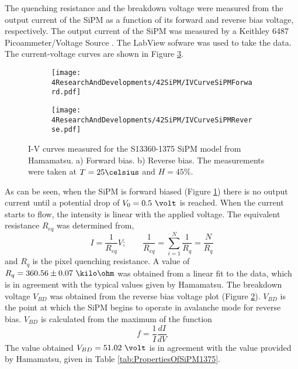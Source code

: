The quenching resistance and the breakdown voltage were measured from the output current of the SiPM as a function of its forward and reverse bias voltage, respectively. The output current of the SiPM was measured by a Keithley 6487 Picoammeter/Voltage Source \cite{DataSheetKeithley6487}. The LabView sofware was used to take the data. The current-voltage curves are shown in Figure \ref{fig:IVcurveSiPM}.
\begin{figure}
\centering
    \begin{subfigure}[b]{0.9\textwidth}
    \centering
    \texttt{[image: 4ResearchAndDevelopments/42SiPM/IVCurveSiPMForward.pdf]}  
    \caption{\label{subfig:IVcurveForward}}
    \end{subfigure}
    \hfill
    \begin{subfigure}[b]{0.9\textwidth}
    \centering
    \texttt{[image: 4ResearchAndDevelopments/42SiPM/IVCurveSiPMReverse.pdf]}  
    \caption{\label{subfig:IVcurveReverse}}
    \end{subfigure}
 \caption{I-V curves measured for the S13360-1375 SiPM model from Hamamatsu. a) Forward bias. b) Reverse bias. The measurements were taken at $T=25\celsius$ and $H=45\%$.}
 \label{fig:IVcurveSiPM}
\end{figure}
As can be seen, when the SiPM is forward biased (Figure \ref{subfig:IVcurveForward}) there is no output current until a potential drop of $V_0= 0.5~\volt$ is reached. When the current starts to flow, the intensity is linear with the applied voltage. The equivalent resistance $R_{eq}$ was determined from, 
\begin{equation}
I=\frac{1}{R_{eq}}V;  \qquad \frac{1}{R_{eq}} = \sum_{i=1}^{N}\frac{1}{R_{q}}= \frac{N}{R_{q}}
\label{QuenchingResistance}
\end{equation}
and $R_{q}$ is the pixel quenching resistance. A value of $R_{q}= 360.56 \pm 0.07~\kilo\ohm$ was obtained from a linear fit to the data, which is in agreement with the typical values given by Hamamatsu. The breakdown voltage $V_{BD}$ was obtained from the reverse bias voltage plot (Figure \ref{subfig:IVcurveReverse}). $V_{BD}$ is the point at which the SiPM begins to operate in avalanche mode for reverse bias. $V_{BD}$ is calculated from the maximum of the function 
\begin{equation}
f=\frac{1}{I}\frac{dI}{dV}
\label{BreakDownVoltageFunction}
\end{equation}
The value obtained $V_{BD}=51.02~\volt$ is in agreement with the value provided by Hamamatsu, given in Table \ref{tab:PropertiesOfSiPM1375}.

